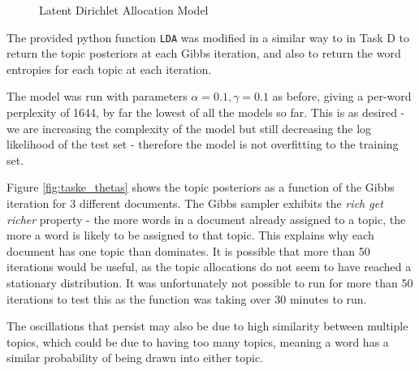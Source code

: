 \documentclass[11pt]{amsart}
\begin{document}
\begin{figure}[h]
    \centering
    \caption[Latent Dirichlet Allocation Model]{Latent Dirichlet Allocation Model\protect\footnotemark} \label{fig:e_model}
\end{figure}

The provided python function \verb|LDA| was modified in a similar way to in Task D to return the topic posteriors at each Gibbs iteration, and also to return the word entropies for each topic at each iteration.

The model was run with parameters $\alpha =0.1, \gamma = 0.1$ as before, giving a per-word perplexity of 1644, by far the lowest of all the models so far. This is as desired - we are increasing the complexity of the model but still decreasing the log likelihood of the test set - therefore the model is not overfitting to the training set.

Figure \ref{fig:taske_thetas} shows the topic posteriors as a function of the Gibbs iteration for 3 different documents. The Gibbs sampler exhibits the \emph{rich get richer} property - the more words in a document already assigned to a topic, the more a word is likely to be assigned to that topic. This explains why each document has one topic than dominates. It is possible that more than 50 iterations would be useful, as the topic allocations do not seem to have reached a stationary distribution. It was unfortunately not possible to run for more than 50 iterations to test this as the function was taking over 30 minutes to run.

The oscillations that persist may also be due to high similarity between multiple topics, which could be due to having too many topics, meaning a word has a similar probability of being drawn into either topic.
\end{document}
